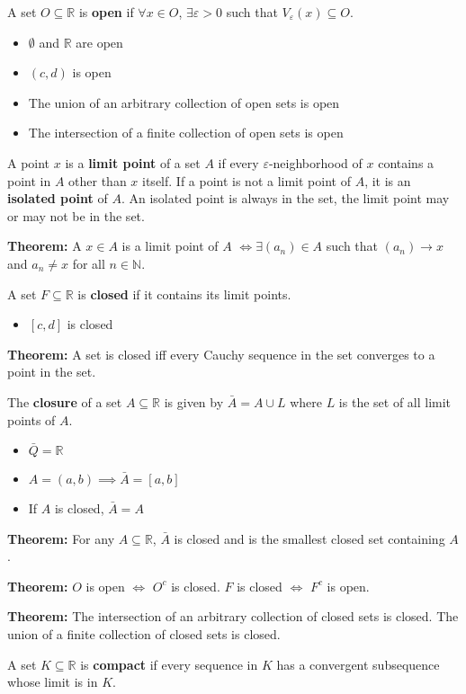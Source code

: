 \documentclass[12pt]{article}
\newcommand{\R}{\mathbb{R}}
\newcommand{\N}{\mathbb{N}}
\newcommand{\ep}{\varepsilon}
\begin{document}
A set $O \subseteq \R$ is \textbf{open} if $\forall x \in O$, $\exists \ep > 0$ such that $V_{\ep}(x) \subseteq O$.
\begin{itemize}
    \item $\emptyset$ and $\R$ are open
    \item $(c, d)$ is open 
    \item The union of an arbitrary collection of open sets is open
    \item The intersection of a finite collection of open sets is open
\end{itemize}

A point $x$ is a \textbf{limit point} of a set $A$ if every $\ep$-neighborhood of $x$ contains a point in $A$ other than $x$ itself. If a point is not a limit point of $A$, it is an \textbf{isolated point} of $A$. An isolated point is always in the set, the limit point may or may not be in the set.

\textbf{Theorem:} A $x \in A$ is a limit point of $A$ $\iff \exists (a_n) \in A$ such that $(a_n) \to x$ and $a_n \neq x$ for all $n \in \N$. 

A set $F \subseteq \R$ is \textbf{closed} if it contains its limit points. 
\begin{itemize}
    \item $[c, d]$ is closed
\end{itemize}

\textbf{Theorem:} A set is closed iff every Cauchy sequence in the set converges to a point in the set.

The \textbf{closure} of a set $A \subseteq \R$ is given by $\bar A = A \cup L$ where $L$ is the set of all limit points of $A$.
\begin{itemize}
    \item $\bar Q = \R$
    \item $A = (a, b) \implies \bar A = [a, b]$
    \item If $A$ is closed, $\bar A = A$
\end{itemize}

\textbf{Theorem:} For any $A \subseteq \R$, $\bar A$ is closed and is the smallest closed set containing $A$.

\textbf{Theorem:} $O$ is open $\iff$ $O^c$ is closed. $F$ is closed $\iff$ $F^c$ is open.

\textbf{Theorem:} The intersection of an arbitrary collection of closed sets is closed. The union of a finite collection of closed sets is closed.

A set $K \subseteq \R$ is \textbf{compact} if every sequence in $K$ has a convergent subsequence whose limit is in $K$.
\end{document}
